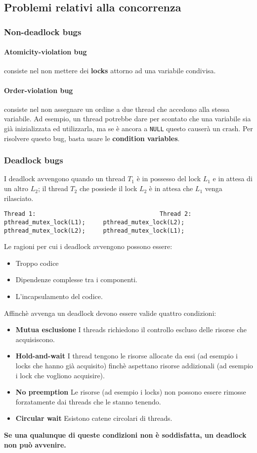 \documentclass[12pt, twoside, letterpaper]{article}
\begin{document}
		\subsection{Problemi relativi alla concorrenza}
			\subsubsection{Non-deadlock bugs}
				\paragraph{Atomicity-violation bug} consiste nel non mettere dei \textbf{locks} attorno ad una variabile condivisa.
				\paragraph{Order-violation bug} consiste nel non assegnare un ordine a due thread che accedono alla stessa variabile. Ad esempio, un thread potrebbe dare per scontato che una variabile sia già inizializzata ed utilizzarla, ma se è ancora a \texttt{NULL} questo causerà un crash. Per risolvere questo bug, basta usare le \textbf{condition variables}.
				
			\subsubsection{Deadlock bugs}
				I deadlock avvengono quando un thread $T_1$ è in possesso del lock $L_1$ e in attesa di un altro $L_2$; il thread $T_2$ che possiede il lock $L_2$ è in attesa che $L_1$ venga rilasciato.
				\begin{lstlisting}[style=CStyle]
Thread 1:									Thread 2:
pthread_mutex_lock(L1);		pthread_mutex_lock(L2);
pthread_mutex_lock(L2);		pthread_mutex_lock(L1);\end{lstlisting}
				Le ragioni per cui i deadlock avvengono possono essere: 
				\begin{itemize}
					\item Troppo codice
					\item Dipendenze complesse tra i componenti.
					\item L'incapsulamento del codice.
				\end{itemize}
				Affinchè avvenga un deadlock devono essere valide quattro condizioni: 
				\begin{itemize}
					\item \textbf{Mutua esclusione} I threads richiedono il controllo escluso delle risorse che acquisiscono.
					\item \textbf{Hold-and-wait} I thread tengono le risorse allocate da essi (ad esempio i locks che hanno già acquisito) finchè aspettano risorse addizionali (ad esempio i lock che vogliono acquisire).
					\item \textbf{No preemption} Le risorse (ad esempio i locks) non possono essere rimosse forzatamente dai threads che le stanno tenendo.
					\item \textbf{Circular wait} Esistono catene circolari di threads.
				\end{itemize}
				\textbf{Se una qualunque di queste condizioni non è soddisfatta, un deadlock non può avvenire.}
\end{document}
